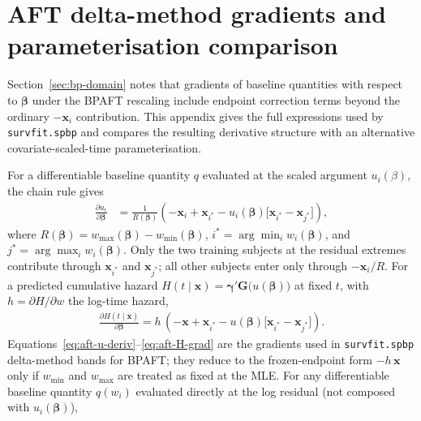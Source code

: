 \documentclass[5p,lefttitle]{elsarticle}
\begin{document}
{\section{AFT delta-method gradients and parameterisation comparison}\label{app:aft-gradients}

Section~\ref{sec:bp-domain} notes that gradients of baseline quantities with
respect to \(\boldsymbol{\beta}\) under the BPAFT rescaling include endpoint
correction terms beyond the ordinary \(-\boldsymbol{x}_i\) contribution.
This appendix gives the full expressions used by \texttt{survfit.spbp} and
compares the resulting derivative structure with an alternative
covariate-scaled-time parameterisation.

For a differentiable baseline quantity \(q\) evaluated at the scaled
argument \(u_i(\beta)\), the chain rule gives
{\footnotesize\begin{align}
\frac{\partial u_i}{\partial\boldsymbol{\beta}}
&=
\frac{1}{R(\boldsymbol{\beta})}
\left(
-\boldsymbol{x}_i
+\boldsymbol{x}_{i^\ast}
-u_i(\boldsymbol{\beta})\bigl[\boldsymbol{x}_{i^\ast}-\boldsymbol{x}_{j^\ast}\bigr]
\right),
\label{eq:aft-u-deriv}
\end{align}\normalsize}
where \(R(\boldsymbol{\beta})=w_{\max}(\boldsymbol{\beta})-w_{\min}(\boldsymbol{\beta})\),
\(i^\ast=\arg\min_i w_i(\boldsymbol{\beta})\), and
\(j^\ast=\arg\max_i w_i(\boldsymbol{\beta})\).
Only the two training subjects at the residual extremes contribute
through \(\boldsymbol{x}_{i^\ast}\) and \(\boldsymbol{x}_{j^\ast}\); all other
subjects enter only through \(-\boldsymbol{x}_i/R\).
For a predicted cumulative hazard
\(H(t\mid\boldsymbol{x})=\boldsymbol{\gamma}'\boldsymbol{G}\bigl(u(\boldsymbol{\beta})\bigr)\)
at fixed \(t\), with \(h=\partial H/\partial w\) the log-time hazard,
{\footnotesize\begin{align}
\frac{\partial H(t\mid\boldsymbol{x})}{\partial\boldsymbol{\beta}}
=
h\,
\left(
-\boldsymbol{x}
+\boldsymbol{x}_{i^\ast}
-u(\boldsymbol{\beta})\bigl[\boldsymbol{x}_{i^\ast}-\boldsymbol{x}_{j^\ast}\bigr]
\right).
\label{eq:aft-H-grad}
\end{align}\normalsize}
Equations~\eqref{eq:aft-u-deriv}--\eqref{eq:aft-H-grad} are the gradients
used in \texttt{survfit.spbp} delta-method bands for BPAFT; they reduce to
the frozen-endpoint form \(-h\,\boldsymbol{x}\) only if
\(w_{\min}\) and \(w_{\max}\) are treated as fixed at the MLE. For any differentiable baseline quantity
\(q(w_i)\) evaluated directly at the log residual (not composed with
\(u_i(\boldsymbol{\beta})\)),
{\footnotesize\begin{align}

\end{align}}}
\end{document}
